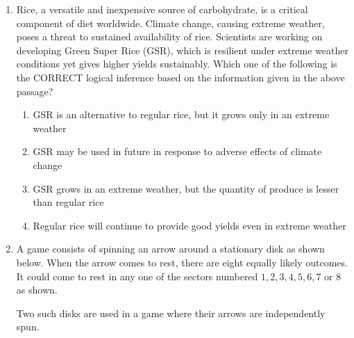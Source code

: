 \documentclass[journal]{IEEEtran}
\numberwithin{equation}{enumi}
\numberwithin{figure}{enumi}
\begin{document}
\begin{enumerate}[start=1, label={Q\arabic*.}]
\begin{enumerate}
  \end{enumerate}
  \vspace{0.5cm}
\item Rice, a versatile and inexpensive source of carbohydrate, is a critical component of diet worldwide. Climate change, causing extreme weather, poses a threat to sustained availability of rice. Scientists are working on developing Green Super Rice (GSR), which is resilient under extreme weather conditions yet gives higher yields sustainably.
Which one of the following is the CORRECT logical inference based on the information given in the above passage?

\begin{enumerate}
    \item GSR is an alternative to regular rice, but it grows only in an extreme weather
    \item GSR may be used in future in response to adverse effects of climate change
    \item GSR grows in an extreme weather, but the quantity of produce is lesser than regular rice
    \item Regular rice will continue to provide good yields even in extreme weather
\end{enumerate}
\vspace{0.5cm}
\item A game consists of spinning an arrow around a stationary disk as shown below. When the arrow comes to rest, there are eight equally likely outcomes. It could come to rest in any one of the sectors numbered $1, 2, 3, 4, 5, 6, 7$ or $8$ as shown.

Two such disks are used in a game where their arrows are independently spun.


\end{enumerate}
\end{document}
